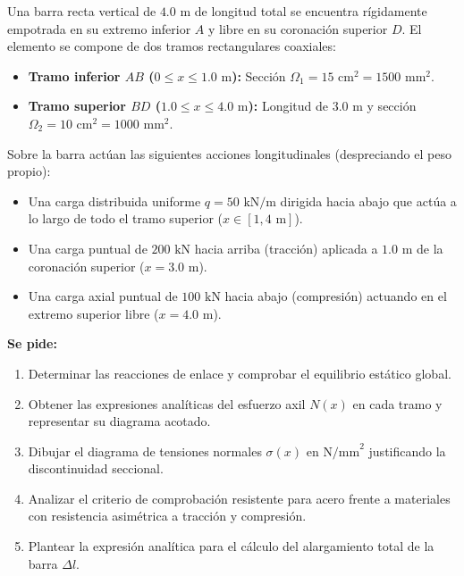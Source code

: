 \begin{tcolorbox}[colback=blue!5!white,colframe=blue!75!black,title=\textbf{Problema 8: Barra Escalonada con Carga Uniformemente Repartida y Cargas Puntuales}]
    Una barra recta vertical de $4.0\text{ m}$ de longitud total se encuentra rígidamente empotrada en su extremo inferior $A$ y libre en su coronación superior $D$. El elemento se compone de dos tramos rectangulares coaxiales:
    \begin{itemize}
        \item \textbf{Tramo inferior $AB$ ($0 \le x \le 1.0\text{ m}$):} Sección $\Omega_1 = 15\text{ cm}^2 = 1500\text{ mm}^2$.
        \item \textbf{Tramo superior $BD$ ($1.0 \le x \le 4.0\text{ m}$):} Longitud de $3.0\text{ m}$ y sección $\Omega_2 = 10\text{ cm}^2 = 1000\text{ mm}^2$.
    \end{itemize}

    Sobre la barra actúan las siguientes acciones longitudinales (despreciando el peso propio):
    \begin{itemize}
        \item Una carga distribuida uniforme $q = 50\text{ kN/m}$ dirigida hacia abajo que actúa a lo largo de todo el tramo superior ($x \in [1, 4\text{ m}]$).
        \item Una carga puntual de $200\text{ kN}$ hacia arriba (tracción) aplicada a $1.0\text{ m}$ de la coronación superior ($x = 3.0\text{ m}$).
        \item Una carga axial puntual de $100\text{ kN}$ hacia abajo (compresión) actuando en el extremo superior libre ($x = 4.0\text{ m}$).
    \end{itemize}

    \textbf{Se pide:}
    \begin{enumerate}[label=\textbf{\Alph*)}]
        \item Determinar las reacciones de enlace y comprobar el equilibrio estático global.
        \item Obtener las expresiones analíticas del esfuerzo axil $N(x)$ en cada tramo y representar su diagrama acotado.
        \item Dibujar el diagrama de tensiones normales $\sigma(x)$ en $\text{N/mm}^2$ justificando la discontinuidad seccional.
        \item Analizar el criterio de comprobación resistente para acero frente a materiales con resistencia asimétrica a tracción y compresión.
        \item Plantear la expresión analítica para el cálculo del alargamiento total de la barra $\Delta l$.
    \end{enumerate}
\end{tcolorbox}


